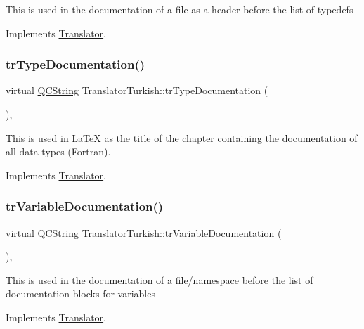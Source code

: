 This is used in the documentation of a file as a header before the list of typedefs 

Implements \mbox{\hyperlink{class_translator}{Translator}}.

\mbox{\label{class_translator_turkish_a798bab9fa23b1e32dd9ffc8bdc1f880f}} 
\subsubsection{\texorpdfstring{trTypeDocumentation()}{trTypeDocumentation()}}
{\footnotesize\ttfamily virtual \mbox{\hyperlink{class_q_c_string}{Q\+C\+String}} Translator\+Turkish\+::tr\+Type\+Documentation (\begin{DoxyParamCaption}{ }\end{DoxyParamCaption})\hspace{0.3cm}{\ttfamily [inline]}, {\ttfamily [virtual]}}

This is used in La\+TeX as the title of the chapter containing the documentation of all data types (Fortran). 

Implements \mbox{\hyperlink{class_translator}{Translator}}.

\mbox{\label{class_translator_turkish_a9b637890abba9eb1dce1f1000453a7da}} 
\subsubsection{\texorpdfstring{trVariableDocumentation()}{trVariableDocumentation()}}
{\footnotesize\ttfamily virtual \mbox{\hyperlink{class_q_c_string}{Q\+C\+String}} Translator\+Turkish\+::tr\+Variable\+Documentation (\begin{DoxyParamCaption}{ }\end{DoxyParamCaption})\hspace{0.3cm}{\ttfamily [inline]}, {\ttfamily [virtual]}}

This is used in the documentation of a file/namespace before the list of documentation blocks for variables 

Implements \mbox{\hyperlink{class_translator}{Translator}}.

